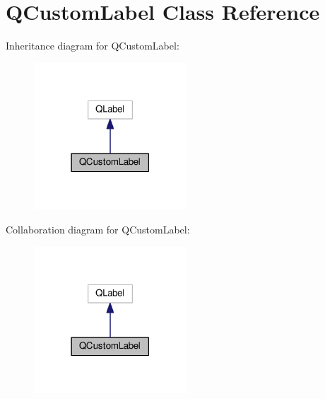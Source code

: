 \hypertarget{classQCustomLabel}{}\section{Q\+Custom\+Label Class Reference}
\label{classQCustomLabel}


Inheritance diagram for Q\+Custom\+Label\+:\nopagebreak
\begin{figure}[H]
\begin{center}
\leavevmode
\includegraphics[width=162pt]{classQCustomLabel__inherit__graph}
\end{center}
\end{figure}


Collaboration diagram for Q\+Custom\+Label\+:\nopagebreak
\begin{figure}[H]
\begin{center}
\leavevmode
\includegraphics[width=162pt]{classQCustomLabel__coll__graph}
\end{center}
\end{figure}
